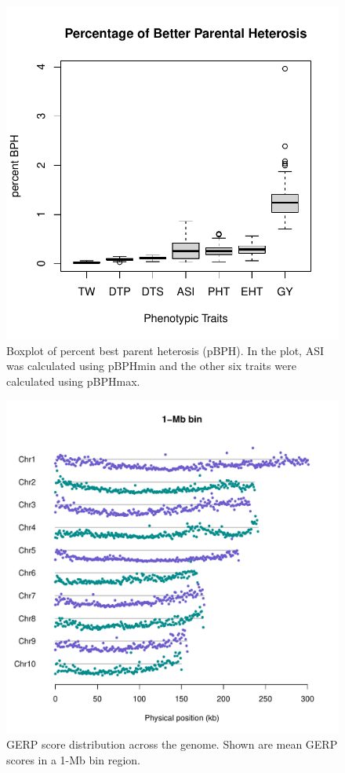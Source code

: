 \documentclass[9pt,twocolumn,twoside]{gsajnl}
\begin{document}
\begin{figure}[htbp]
\centering
\includegraphics[width=\linewidth]{SFig_pBPH.pdf}
\caption{Boxplot of  percent best parent heterosis (pBPH). In the plot, ASI was calculated using pBPHmin and the other six traits were calculated using pBPHmax.}
\label{fig:pBPH}
\end{figure}

\begin{figure}[htbp]
\centering
\includegraphics[width=\linewidth]{SFig_gerp_dis1m.pdf}
\caption{GERP score distribution across the genome. Shown are mean GERP scores in a 1-Mb bin region.}
\label{fig:dis1m}
\end{figure}
\end{document}
